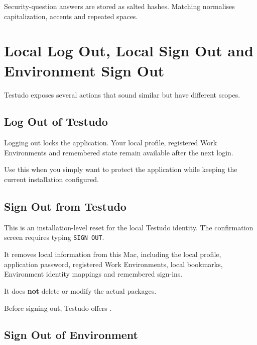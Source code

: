 \documentclass{testudomanual}
\begin{document}
Security-question answers are stored as salted hashes. Matching normalises capitalization, accents and repeated spaces.


\chapter{Local Log Out, Local Sign Out and Environment Sign Out}

Testudo exposes several actions that sound similar but have different scopes.

\section{Log Out of Testudo}

Logging out locks the application. Your local profile, registered Work Environments and remembered state remain available after the next login.

Use this when you simply want to protect the application while keeping the current installation configured.

\section{Sign Out from Testudo}

This is an installation-level reset for the local Testudo identity. The confirmation screen requires typing \texttt{SIGN OUT}.

It removes local information from this Mac, including the local profile, application password, registered Work Environments, local bookmarks, Environment identity mappings and remembered sign-ins.

It does \textbf{not} delete or modify the actual  packages.

Before signing out, Testudo offers .

\section{Sign Out of Environment}
\end{document}
